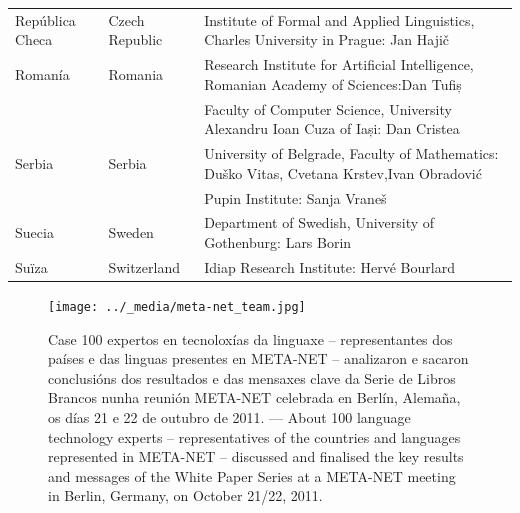 \begin{longtable}{@{}llp{113mm}@{}}
  República Checa  & \textcolor{grey1}{Czech Republic} & Institute of Formal and Applied Linguistics, Charles University in Prague: Jan Hajič \\ \addlinespace
  Romanía   & \textcolor{grey1}{Romania} & Research Institute for Artificial Intelligence, Romanian Academy of Sciences:\newline Dan Tufiș \\ \addlinespace
  & & Faculty of Computer Science, University Alexandru Ioan Cuza of Iași: Dan Cristea \\ \addlinespace
  Serbia & \textcolor{grey1}{Serbia} & University of Belgrade, Faculty of Mathematics: Duško Vitas, Cvetana Krstev,\newline Ivan Obradović \\ \addlinespace
  & & Pupin Institute: Sanja Vraneš \\ \addlinespace  
  Suecia   & \textcolor{grey1}{Sweden} & Department of Swedish, University of Gothenburg: Lars Borin \\ \addlinespace 
  Suïza   & \textcolor{grey1}{Switzerland} & Idiap Research Institute: Hervé Bourlard 
\end{longtable}
\normalsize

\renewcommand*{\figureformat}{}
\renewcommand*{\captionformat}{}

\begin{figure}[htb]
  \center
  \texttt{[image: ../\_media/meta-net\_team.jpg]}
  \caption{
Case 100 expertos en tecnoloxías da linguaxe -- representantes dos países e das linguas presentes en META-NET -- analizaron e sacaron conclusións dos resultados e das mensaxes clave da Serie de Libros Brancos nunha reunión META-NET celebrada en Berlín, Alemaña, os días 21 e 22 de outubro de 2011. ---
 \textcolor{grey1}{About 100 language technology experts -- representatives of the countries and languages represented in META-NET -- discussed and finalised the key results and messages of the White Paper Series at a META-NET meeting in Berlin, Germany, on October 21/22, 2011.}}
  \medskip
\end{figure}

\cleardoublepage

{}

\label{whitepaperseries}

